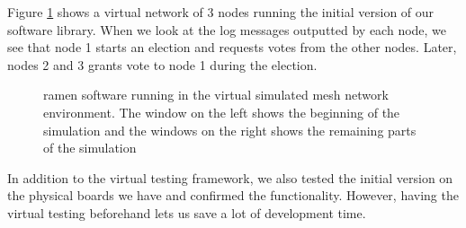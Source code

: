 Figure \ref{fig:virtual_ramen} shows a virtual network of 3 nodes running the initial version of our software library. When we look at the log messages outputted by each node, we see that node 1 starts an election and requests votes from the other nodes. Later, nodes 2 and 3 grants vote to node 1 during the election. 

\begin{figure}[H]
    \centering
    \qquad
    \caption{ramen software running in the virtual simulated mesh network environment. The window on the left shows the beginning of the simulation and the windows on the right shows the remaining parts of the simulation}
    \label{fig:virtual_ramen}%
    \medskip
\end{figure}

In addition to the virtual testing framework, we also tested the initial version on the physical boards we have and confirmed the functionality. However, having the virtual testing beforehand lets us save a lot of development time.